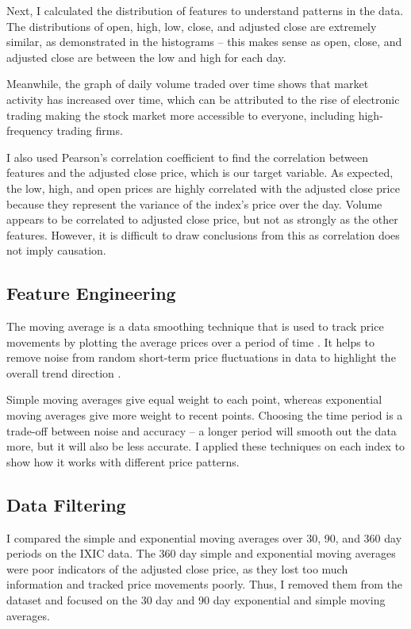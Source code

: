 \documentclass[a4paper, 11pt]{article}
\begin{document}
Next, I calculated the distribution of features to understand patterns in the data. The distributions of open, high, low, close, and adjusted close are extremely similar, as demonstrated in the histograms -- this makes sense as open, close, and adjusted close are between the low and high for each day.

Meanwhile, the graph of daily volume traded over time shows that market activity has increased over time, which can be attributed to the rise of electronic trading making the stock market more accessible to everyone, including high-frequency trading firms.

I also used Pearson's correlation coefficient to find the correlation between features and the adjusted close price, which is our target variable. As expected, the low, high, and open prices are highly correlated with the adjusted close price because they represent the variance of the index's price over the day. Volume appears to be correlated to adjusted close price, but not as strongly as the other features. However, it is difficult to draw conclusions from this as correlation does not imply causation.

\subsection{Feature Engineering}
The moving average is a data smoothing technique that is used to track price movements by plotting the average prices over a period of time \cite{movingAverageChart}. It helps to  remove noise from random short-term price fluctuations in data to highlight the overall trend direction \cite{movingAverageChart}.

Simple moving averages give equal weight to each point, whereas exponential moving averages give more weight to recent points. Choosing the time period is a trade-off between noise and accuracy -- a longer period will smooth out the data more, but it will also be less accurate. I applied these techniques on each index to show how it works with different price patterns.

\subsection{Data Filtering}
I compared the simple and exponential moving averages over 30, 90, and 360 day periods on the IXIC data. The 360 day simple and exponential moving averages were poor indicators of the adjusted close price, as they lost too much information and tracked price movements poorly. Thus, I removed them from the dataset and focused on the 30 day and 90 day exponential and simple moving averages.
\end{document}
